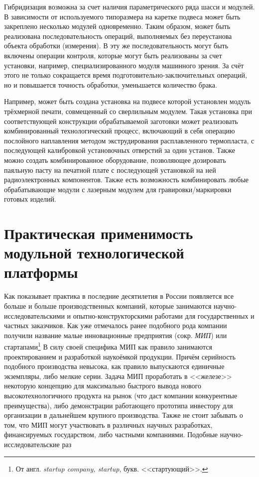 Гибридизация возможна за счет наличия параметрического ряда шасси и модулей. В зависимости от используемого типоразмера на каретке подвеса может быть закреплено несколько модулей одновременно. Таким образом, может быть реализована последовательность операций, выполняемых без переустанова объекта обработки (измерения). В эту же последовательность могут быть включены операции контроля, которые могут быть реализованы за счет установки, например, специализированного модуля машинного зрения. За счёт этого не только сокращается время подготовительно-заключительных операций, но и повышается точность обработки, уменьшается количество брака.

Например, может быть создана установка на подвесе которой установлен модуль трёхмерной печати, совмещенный со сверлильным модулем. Такая установка при соответствующей конструкции обрабатываемой заготовки может реализовать комбинированный технологический процесс, включающий в себя операцию послойного наплавления методом экструдирования расплавленного термопласта, с последующей калибровкой установочных отверстий за один установ. Также можно создать комбинированное оборудование, позволяющее дозировать паяльную пасту на печатной плате с последующей установкой на ней радиоэлектронных компонентов. Также есть возможность комбинировать любые обрабатывающие модули с лазерным модулем для гравировки/маркировки готовых изделий. 


\section{Практическая применимость модульной технологической платформы}

Как показывает практика в последние десятилетия в России появляется все больше и больше производственных компаний, которые занимаются научно-исследовательскими и опытно-конструкторскими работами для государственных и частных заказчиков. Как уже отмечалось ранее подобного рода компании получили название малые инновационные предприятия (сокр. \textit{МИП}) или стартапами\footnote{От англ. \textit{startup company, startup}, букв. <<стартующий>>.} В силу своей специфика МИП как правило занимаются проектированием и разработкой наукоёмкой продукции. Причём серийность подобного производства невысока, как правило выпускаются единичные экземпляры, либо мелкие серии. Задача МИП проработать в <<железе>> некоторую концепцию для максимально быстрого вывода нового высокотехнологичного продукта на рынок (что даст компании конкурентные преимущества), либо демонстрации работающего прототипа инвестору для организации в дальнейшем крупного производства. Также не стоит забывать о том, что МИП могут участвовать в различных научных разработках, финансируемых государством, либо частными компаниями. Подобные научно-исследовательские раз

